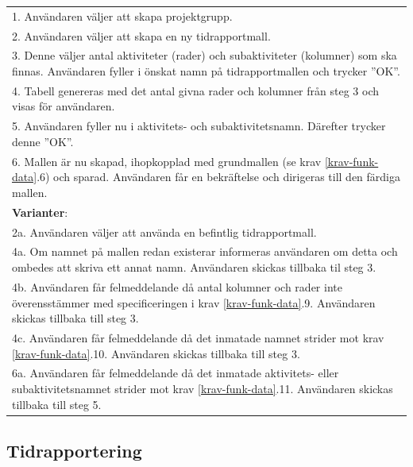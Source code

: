 \documentclass[a4paper]{article}
\begin{document}
\begin{table}[H]
\begin{tabular}{ | p{2cm} p{11cm} | }
	\multicolumn{2}{|p{13cm}|}{1. Användaren väljer att skapa projektgrupp.}\\
	\multicolumn{2}{|p{13cm}|}{2. Användaren väljer att skapa en ny tidrapportmall.} \\	
	\multicolumn{2}{|p{13cm}|}{3. Denne väljer antal aktiviteter (rader) och subaktiviteter (kolumner) som ska finnas. Användaren fyller i önskat namn på tidrapportmallen och trycker ''OK''.} \\	
	\multicolumn{2}{|p{13cm}|}{4. Tabell genereras med det antal givna rader och kolumner från steg 3 och visas för användaren.} \\	
	\multicolumn{2}{|p{13cm}|}{5. Användaren fyller nu i aktivitets- och subaktivitetsnamn. Därefter trycker denne ''OK''.} \\	
	\multicolumn{2}{|p{13cm}|}{6. Mallen är nu skapad, ihopkopplad med grundmallen (se krav \ref{krav-funk-data}.6) och sparad. Användaren får en bekräftelse och dirigeras till den färdiga mallen.} \\	
	\hline
    \multicolumn{2}{|p{13cm}|}{\textbf{Varianter}: }\\
    \multicolumn{2}{|p{13cm}|}{2a. Användaren väljer att använda en befintlig tidrapportmall.}\\
    \multicolumn{2}{|p{13cm}|}{4a. Om namnet på mallen redan existerar informeras användaren om detta och ombedes att skriva ett annat namn. Användaren skickas tillbaka til steg 3.}\\
    \multicolumn{2}{|p{13cm}|}{4b. Användaren får felmeddelande då antal kolumner och rader inte överensstämmer med specificeringen i krav \ref{krav-funk-data}.9. Användaren skickas tillbaka till steg 3.}\\
       \multicolumn{2}{|p{13cm}|}{4c. Användaren får felmeddelande då det inmatade namnet strider mot krav \ref{krav-funk-data}.10. Användaren skickas tillbaka till steg 3.}\\
    \multicolumn{2}{|p{13cm}|}{6a. Användaren får felmeddelande då det inmatade aktivitets- eller subaktivitetsnamnet strider mot krav \ref{krav-funk-data}.11. Användaren skickas tillbaka till steg 5.}\\
    \hline
\end{tabular}
\end{table}



\subsection{Tidrapportering}
\label{krav-funk-tid}
\end{document}
